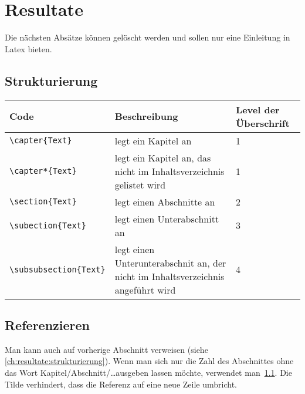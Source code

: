 \chapter{Resultate}
\label{ch:resultate}

Die nächsten Absätze können gelöscht werden und sollen nur eine Einleitung in Latex bieten.


\section{Strukturierung}
\label{ch:resultate:strukturierung}

\begin{tabular}{ l p{5.256cm} l }
    Code                   & Beschreibung                                                                     & Level der Überschrift \\ \hline
    \verb|\capter{Text}| & legt ein Kapitel an                                                              & 1                     \\
    \verb|\capter*{Text}| & legt ein Kapitel an, das nicht im Inhaltsverzeichnis gelistet wird               & 1                     \\
    \verb|\section{Text}| & legt einen Abschnitte an                                                         & 2                     \\
    \verb|\subection{Text}| & legt einen Unterabschnitt an                                                     & 3                     \\
    \verb|\subsubsection{Text}| & legt einen Unterunterabschnit an, der nicht im Inhaltsverzeichnis angeführt wird & 4
\end{tabular}

\section{Referenzieren}

Man kann auch auf vorherige Abschnitt verweisen (siehe \autoref{ch:resultate:strukturierung}). Wenn man sich nur die Zahl des Abschnittes ohne das Wort Kapitel/Abschnitt/\dots ausgeben lassen möchte, verwendet man~\ref{ch:resultate:strukturierung}. Die Tilde verhindert, dass die Referenz auf eine neue Zeile umbricht.


